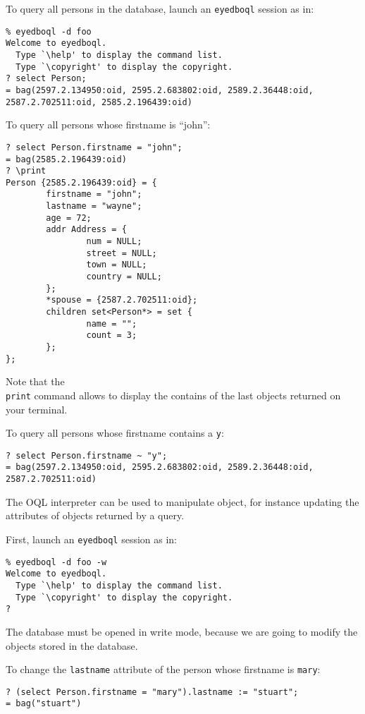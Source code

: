 
To query all persons in the database, launch an \texttt{eyedboql} session as in:
\verbsize \begin{verbatim}
% eyedboql -d foo
Welcome to eyedboql.
  Type `\help' to display the command list.
  Type `\copyright' to display the copyright.
? select Person;
= bag(2597.2.134950:oid, 2595.2.683802:oid, 2589.2.36448:oid, 2587.2.702511:oid, 2585.2.196439:oid)
\end{verbatim}
\normalsize

To query all persons whose firstname is ``john'':
\verbsize \begin{verbatim}
? select Person.firstname = "john";
= bag(2585.2.196439:oid)
? \print
Person {2585.2.196439:oid} = { 
        firstname = "john";
        lastname = "wayne";
        age = 72;
        addr Address = { 
                num = NULL;
                street = NULL;
                town = NULL;
                country = NULL;
        };
        *spouse = {2587.2.702511:oid};
        children set<Person*> = set { 
                name = "";
                count = 3;
        };
};
\end{verbatim}
\normalsize
Note that the \texttt{\\print} command allows to display the contains of the
last objects returned on your terminal.

To query all persons whose firstname contains a \texttt{y}:
\verbsize \begin{verbatim}
? select Person.firstname ~ "y";
= bag(2597.2.134950:oid, 2595.2.683802:oid, 2589.2.36448:oid, 2587.2.702511:oid)
\end{verbatim}
\normalsize



The OQL interpreter can be used to manipulate object, for instance updating the attributes of objects returned by a query.

First, launch an \texttt{eyedboql} session as in:
\verbsize \begin{verbatim}
% eyedboql -d foo -w
Welcome to eyedboql.
  Type `\help' to display the command list.
  Type `\copyright' to display the copyright.
?
\end{verbatim}
\normalsize

The database must be opened in write mode, because we are going to modify the objects stored in the database.

To change the \texttt{lastname} attribute of the person whose firstname is \texttt{mary}:
\verbsize \begin{verbatim}
? (select Person.firstname = "mary").lastname := "stuart";
= bag("stuart")
\end{verbatim}
\normalsize

